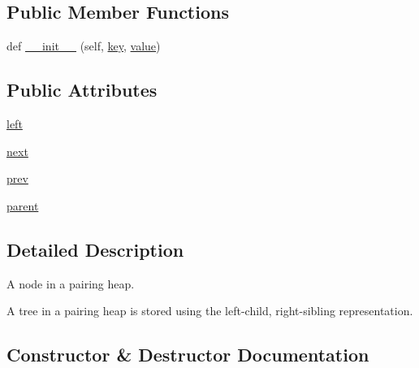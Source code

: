 \subsection*{Public Member Functions}
\begin{DoxyCompactItemize}
\item 
def \hyperlink{classnetworkx_1_1utils_1_1heaps_1_1PairingHeap_1_1__Node_a93f9880b7c6fb1d1cee36239a4d0247c}{\+\_\+\+\_\+init\+\_\+\+\_\+} (self, \hyperlink{classnetworkx_1_1utils_1_1heaps_1_1MinHeap_1_1__Item_a9cdd431494aecd5f17b02a77c3651ae7}{key}, \hyperlink{classnetworkx_1_1utils_1_1heaps_1_1MinHeap_1_1__Item_ad83888d62604e8d9ccd16ccc84846f80}{value})
\end{DoxyCompactItemize}
\subsection*{Public Attributes}
\begin{DoxyCompactItemize}
\item 
\hyperlink{classnetworkx_1_1utils_1_1heaps_1_1PairingHeap_1_1__Node_a1f7c789edc71c3968a24c58564d8b3a4}{left}
\item 
\hyperlink{classnetworkx_1_1utils_1_1heaps_1_1PairingHeap_1_1__Node_a139b94bfa2f2693cd9aef85f1b80d88d}{next}
\item 
\hyperlink{classnetworkx_1_1utils_1_1heaps_1_1PairingHeap_1_1__Node_a711d9e6d04a0d92f79ae32b2768581cd}{prev}
\item 
\hyperlink{classnetworkx_1_1utils_1_1heaps_1_1PairingHeap_1_1__Node_aee5a55569f6566528573f951bb8d7b8e}{parent}
\end{DoxyCompactItemize}


\subsection{Detailed Description}
\begin{DoxyVerb}A node in a pairing heap.

A tree in a pairing heap is stored using the left-child, right-sibling
representation.
\end{DoxyVerb}
 

\subsection{Constructor \& Destructor Documentation}
\mbox{\label{classnetworkx_1_1utils_1_1heaps_1_1PairingHeap_1_1__Node_a93f9880b7c6fb1d1cee36239a4d0247c}} 
